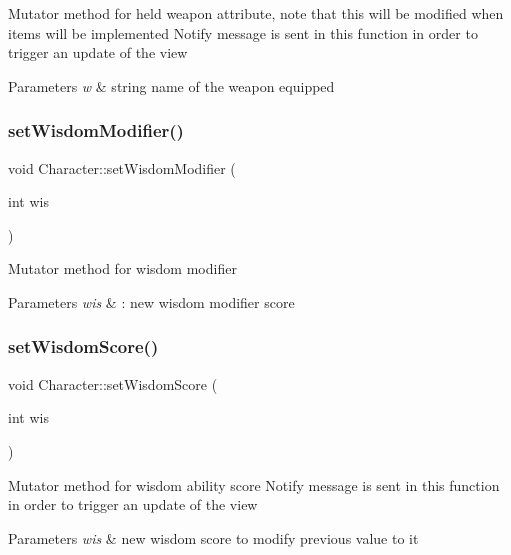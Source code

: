 Mutator method for held weapon attribute, note that this will be modified when items will be implemented Notify message is sent in this function in order to trigger an update of the view 
\begin{DoxyParams}{Parameters}
{\em w} & string name of the weapon equipped \\
\hline
\end{DoxyParams}
\hypertarget{class_character_af3e55f3f6018cf490471993ebcd95110}{}\label{class_character_af3e55f3f6018cf490471993ebcd95110} 
\subsubsection{\texorpdfstring{set\+Wisdom\+Modifier()}{setWisdomModifier()}}
{\footnotesize\ttfamily void Character\+::set\+Wisdom\+Modifier (\begin{DoxyParamCaption}\item[{int}]{wis }\end{DoxyParamCaption})}

Mutator method for wisdom modifier 
\begin{DoxyParams}{Parameters}
{\em wis} & \+: new wisdom modifier score \\
\hline
\end{DoxyParams}
\hypertarget{class_character_a9940a14b5050a9962ec6a042363a90d6}{}\label{class_character_a9940a14b5050a9962ec6a042363a90d6} 
\subsubsection{\texorpdfstring{set\+Wisdom\+Score()}{setWisdomScore()}}
{\footnotesize\ttfamily void Character\+::set\+Wisdom\+Score (\begin{DoxyParamCaption}\item[{int}]{wis }\end{DoxyParamCaption})}

Mutator method for wisdom ability score Notify message is sent in this function in order to trigger an update of the view 
\begin{DoxyParams}{Parameters}
{\em wis} & new wisdom score to modify previous value to it \\
\hline
\end{DoxyParams}
\hypertarget{class_character_a9ee4f3f4e98b8babaa4d8e49ea44b99f}{}\label{class_character_a9ee4f3f4e98b8babaa4d8e49ea44b99f} 
